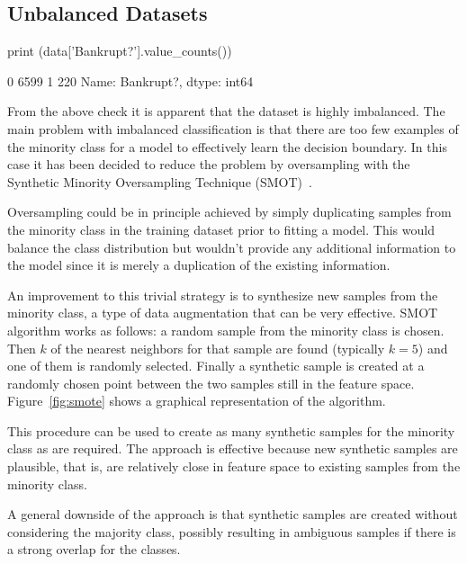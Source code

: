 \subsection{Unbalanced Datasets}

\begin{ipython}
print (data['Bankrupt?'].value_counts())
\end{ipython}
\begin{ioutput}
0    6599
1     220
Name: Bankrupt?, dtype: int64
\end{ioutput}

From the above check it is apparent that the dataset is highly imbalanced. The main problem with imbalanced classification is that there are too few examples of the minority class for a model to effectively learn the decision boundary. In this case it has been decided to reduce the problem by oversampling with the Synthetic Minority Oversampling Technique (SMOT)~\cite{bib:smot}. 

\begin{attention}
Oversampling could be in principle achieved by simply duplicating samples from the minority class in the training dataset prior to fitting a model. This would balance the class distribution but wouldn't provide any additional information to the model since it is merely a duplication of the existing information.
	
An improvement to this trivial strategy is to synthesize new samples from the minority class, a type of data augmentation that can be very effective.
SMOT algorithm works as follows: a random sample from the minority class is chosen. Then $k$ of the nearest neighbors for that sample are found (typically $k=5$) and one of them is randomly selected. Finally a synthetic sample is created at a randomly chosen point between the two samples still in the feature space.
Figure~\ref{fig:smote} shows a graphical representation of the algorithm.

This procedure can be used to create as many synthetic samples for the minority class as are required. 
The approach is effective because new synthetic samples are plausible, that is, are relatively close in feature space to existing samples from the minority class.

A general downside of the approach is that synthetic samples are created without considering the majority class, possibly resulting in ambiguous samples if there is a strong overlap for the classes.
\end{attention}

